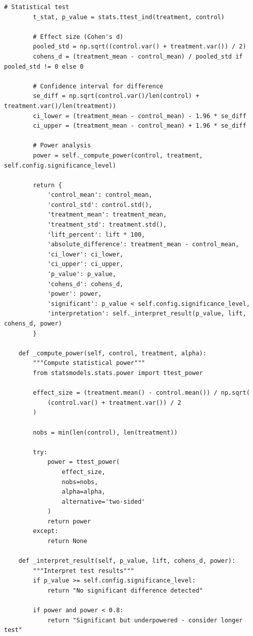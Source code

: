 \begin{lstlisting}[style=python, caption=Production A/B testing framework for ML models]
        # Statistical test
        t_stat, p_value = stats.ttest_ind(treatment, control)

        # Effect size (Cohen's d)
        pooled_std = np.sqrt((control.var() + treatment.var()) / 2)
        cohens_d = (treatment_mean - control_mean) / pooled_std if pooled_std != 0 else 0

        # Confidence interval for difference
        se_diff = np.sqrt(control.var()/len(control) + treatment.var()/len(treatment))
        ci_lower = (treatment_mean - control_mean) - 1.96 * se_diff
        ci_upper = (treatment_mean - control_mean) + 1.96 * se_diff

        # Power analysis
        power = self._compute_power(control, treatment, self.config.significance_level)

        return {
            'control_mean': control_mean,
            'control_std': control.std(),
            'treatment_mean': treatment_mean,
            'treatment_std': treatment.std(),
            'lift_percent': lift * 100,
            'absolute_difference': treatment_mean - control_mean,
            'ci_lower': ci_lower,
            'ci_upper': ci_upper,
            'p_value': p_value,
            'cohens_d': cohens_d,
            'power': power,
            'significant': p_value < self.config.significance_level,
            'interpretation': self._interpret_result(p_value, lift, cohens_d, power)
        }

    def _compute_power(self, control, treatment, alpha):
        """Compute statistical power"""
        from statsmodels.stats.power import ttest_power

        effect_size = (treatment.mean() - control.mean()) / np.sqrt(
            (control.var() + treatment.var()) / 2
        )

        nobs = min(len(control), len(treatment))

        try:
            power = ttest_power(
                effect_size,
                nobs=nobs,
                alpha=alpha,
                alternative='two-sided'
            )
            return power
        except:
            return None

    def _interpret_result(self, p_value, lift, cohens_d, power):
        """Interpret test results"""
        if p_value >= self.config.significance_level:
            return "No significant difference detected"

        if power and power < 0.8:
            return "Significant but underpowered - consider longer test"


\end{lstlisting}

